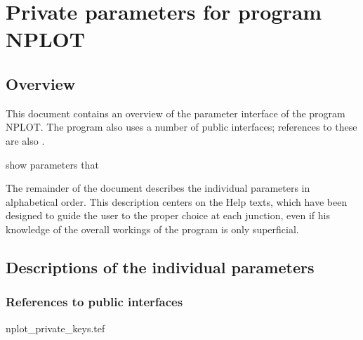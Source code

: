 
\chapter{ Private parameters for program NPLOT}
\tableofcontents


\section{ Overview}

	This document contains an overview of the parameter interface of the
program NPLOT. The program also uses a number of public interfaces; references
to these are also .

show %
parameters that %


	The remainder of the document describes the individual parameters in
alphabetical order. This description centers on the Help texts, which have been
designed to guide the user to the proper choice at each junction, even if his
knowledge of the overall workings of the program is only superficial.


\section{ Descriptions of the individual parameters}
\label{.descriptions}

\subsection{ References to public interfaces}
\label{.public}

 {nplot_private_keys.tef}
